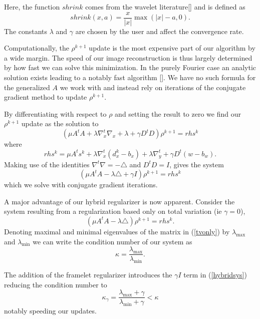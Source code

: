 \documentclass[11pt]{amsart}
\theoremstyle{remark}
\begin{document}
Here, the function $shrink$ comes from the wavelet literature[] and is defined as
\begin{equation}
shrink(x,a) = \frac{x}{|x|} \max (|x|-a,0).
\end{equation}
The constants $\lambda$ and $\gamma$ are chosen by the user and affect the convergence rate.

Computationally, the $\rho^{k+1}$ update is the most expensive part of our algorithm by a wide margin. The speed of our image reconstruction is thus largely determined by how fast we can solve this minimization. In the purely Fourier case an analytic solution exists leading to a notably fast algorithm []. We have no such formula for the generalized $A$ we work with and instead rely on iterations of the conjugate gradient method to update $\rho^{k+1}$.

By differentiating with respect to $\rho$ and setting the result to zero we find our $\rho^{k+1}$ update as the solution to
\begin{equation}
(\mu A^tA + \lambda \nabla_x^t \nabla_x + \lambda + \gamma D^tD )\rho^{k+1} = rhs^k
\end{equation}
where
\begin{equation}
rhs^k = \mu A^t s^k + \lambda \nabla_x ^t (d_x^k - b_x) + \lambda \nabla_y^t + \gamma D^t(w - b_w).
\end{equation}
Making use of the identities $\nabla^t \nabla = - \triangle$ and $D^tD = I$, gives the system
\begin{equation}\label{hybridsys}
(\mu A^tA - \lambda \triangle + \gamma I )\rho^{k+1} = rhs^k
\end{equation}
which we solve with conjugate gradient iterations.

A major advantage of our hybrid regularizer is now apparent. Consider the system resulting from a regularization based only on total variation (ie $\gamma =0$),
\begin{equation}\label{tvonly}
(\mu A^tA - \lambda \triangle)\rho^{k+1} = rhs^k.
\end{equation}
Denoting maximal and minimal eigenvalues of the matrix in (\ref{tvonly}) by $\lambda_{\max}$ and $\lambda_{\min}$ we can write the condition number of our system as
\begin{equation}
\kappa = \frac{\lambda_{\max}}{\lambda_{\min}}.
\end{equation}

The addition of the framelet regularizer introduces the $\gamma I$ term in (\ref{hybridsys}) reducing the condition number to
\begin{equation}
\kappa_\gamma  =  \frac{\lambda_{\max} + \gamma}{\lambda_{\min} + \gamma} < \kappa
\end{equation}
notably speeding our updates.
\end{document}
